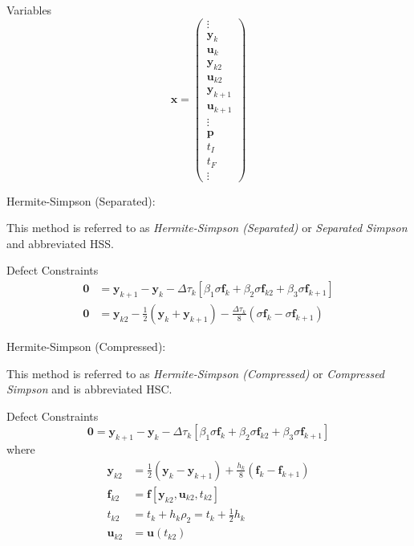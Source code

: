 \documentclass[]{article}
\begin{document}
\noindent Variables 
\begin{equation}
    \mathbf{x} = \begin{pmatrix}
        \vdots \\ \mathbf{y}_k \\ \mathbf{u}_k \\ \mathbf{y}_{k2} \\ \mathbf{u}_{k2} \\ \mathbf{y}_{k+1} \\ \mathbf{u}_{k+1} \\ \vdots \\ \mathbf{p} \\ t_I \\ t_F \\ \vdots
    \end{pmatrix}
\end{equation}
\vspace{2mm}

\noindent Hermite-Simpson (Separated):

\noindent This method is referred to as \textit{Hermite-Simpson (Separated)} or \textit{Separated Simpson} and abbreviated HSS. \vspace{2mm}

\noindent Defect Constraints
\begin{align}
    \mathbf{0} &= \mathbf{y}_{k+1} - \mathbf{y}_k - \Delta\tau_k\left[\beta_1\sigma\mathbf{f}_k + \beta_2\sigma\mathbf{f}_{k2}+ \beta_3\sigma\mathbf{f}_{k+1}\right] \\ 
    \mathbf{0} &= \mathbf{y}_{k2} - \frac{1}{2}(\mathbf{y}_k + \mathbf{y}_{k+1}) - \frac{\Delta \tau_k}{8}(\sigma\mathbf{f}_k - \sigma\mathbf{f}_{k+1})
\end{align}
\vspace{2mm}

\noindent Hermite-Simpson (Compressed):

\noindent This method is referred to as \textit{Hermite-Simpson (Compressed)} or \textit{Compressed Simpson} and is abbreviated HSC.\vspace{2mm}

\noindent Defect Constraints
\begin{equation}
    \mathbf{0} = \mathbf{y}_{k+1} - \mathbf{y}_k - \Delta\tau_k\left[\beta_1\sigma\mathbf{f}_k + \beta_2\sigma\mathbf{f}_{k2}+ \beta_3\sigma\mathbf{f}_{k+1}\right]
\end{equation}
where
\begin{align}
    \mathbf{y}_{k2} &= \frac{1}{2}(\mathbf{y}_k - \mathbf{y}_{k+1}) + \frac{h_k}{8}(\mathbf{f}_k - \mathbf{f}_{k+1}) \\ 
    \mathbf{f}_{k2} &= \mathbf{f}\left[\mathbf{y}_{k2},\mathbf{u}_{k2},t_{k2}\right] \\ 
    t_{k2} &= t_k + h_k\rho_2 = t_k + \frac{1}{2}h_k \\ 
    \mathbf{u}_{k2} &= \mathbf{u}(t_{k2})
\end{align}
\vspace{2mm}
\end{document}
